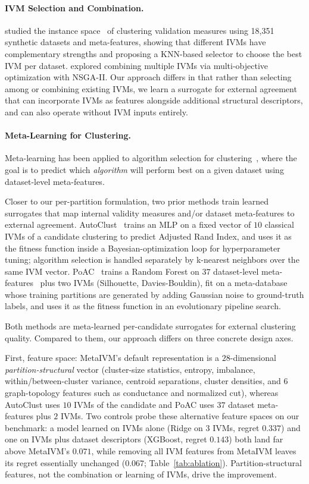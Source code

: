 \documentclass[10pt]{article} %
\begin{document}
\paragraph{IVM Selection and Combination.}
\citet{simpson2026instance} studied the instance space~\citep{smith2023instance} of clustering validation measures using 18,351 synthetic datasets and meta-features, showing that different IVMs have complementary strengths and proposing a KNN-based selector to choose the best IVM per dataset. \citet{azevedo2025multi} explored combining multiple IVMs via multi-objective optimization with NSGA-II. Our approach differs in that rather than selecting among or combining existing IVMs, we learn a surrogate for external agreement that can incorporate IVMs as features alongside additional structural descriptors, and can also operate without IVM inputs entirely.

\paragraph{Meta-Learning for Clustering.}
Meta-learning has been applied to algorithm selection for clustering~\citep{ferrari2015clustering, pimentel2019new}, where the goal is to predict which \emph{algorithm} will perform best on a given dataset using dataset-level meta-features.

Closer to our per-partition formulation, two prior methods train learned surrogates that map internal validity measures and/or dataset meta-features to external agreement. AutoClust~\citep{poulakis2020autoclust} trains an MLP on a fixed vector of $10$ classical IVMs of a candidate clustering to predict Adjusted Rand Index, and uses it as the fitness function inside a Bayesian-optimization loop for hyperparameter tuning; algorithm selection is handled separately by k-nearest neighbors over the same IVM vector. PoAC~\citep{dasilva2024poac} trains a Random Forest on $37$ dataset-level meta-features~\citep{lorena2019complexity} plus two IVMs (Silhouette, Davies-Bouldin), fit on a meta-database whose training partitions are generated by adding Gaussian noise to ground-truth labels, and uses it as the fitness function in an evolutionary pipeline search.

Both methods are meta-learned per-candidate surrogates for external clustering quality. Compared to them, our approach differs on three concrete design axes.

First, feature space: MetaIVM's default representation is a $28$-dimensional \emph{partition-structural} vector (cluster-size statistics, entropy, imbalance, within/between-cluster variance, centroid separations, cluster densities, and $6$ graph-topology features such as conductance and normalized cut), whereas AutoClust uses $10$ IVMs of the candidate and PoAC uses $37$ dataset meta-features plus $2$ IVMs. Two controls probe these alternative feature spaces on our benchmark: a model learned on IVMs alone (Ridge on $3$ IVMs, regret $0.337$) and one on IVMs plus dataset descriptors (XGBoost, regret $0.143$) both land far above MetaIVM's $0.071$, while removing all IVM features from MetaIVM leaves its regret essentially unchanged ($0.067$; Table~\ref{tab:ablation}). Partition-structural features, not the combination or learning of IVMs, drive the improvement.
\end{document}

